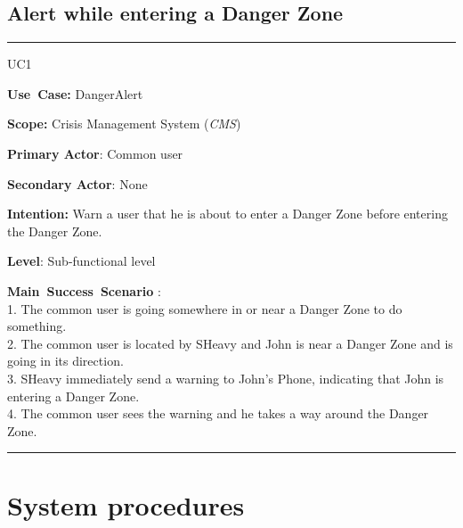 \subsection{Alert while entering a Danger Zone}
\vspace{0.5cm}
\hrule
\vspace{0.5cm}
\begin{lyxlist}{UC1}
\small{
\item [\textbf{Use~Case:}] DangerAlert
\item [\textbf{Scope:}] Crisis Management System (\emph{CMS})
\item [\textbf{Primary Actor}:] Common user
\item [\textbf{Secondary Actor}:] None
\item [\textbf{Intention:}]Warn a user that he is about to enter a Danger Zone 
before entering the Danger Zone.
\item [\textbf{Level}:]Sub-functional level
\item [\textbf{Main~Success~Scenario}]:\\
1. The common user is going somewhere in or near a Danger Zone to do
something.\\
2. The common user is located by SHeavy and John is near a Danger Zone and is
going in its direction.\\
3. SHeavy immediately send a warning to John's Phone, indicating 
that John is entering a Danger Zone.\\
4. The common user sees the warning and he takes a way around the Danger Zone.\\
}
\end{lyxlist}
\hrule
\vspace{0.5cm} 

\section{System procedures}
